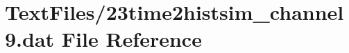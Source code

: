 \hypertarget{23time2histsim__channel9_8dat}{}\section{Text\+Files/23time2histsim\+\_\+channel9.dat File Reference}
\label{23time2histsim__channel9_8dat}
